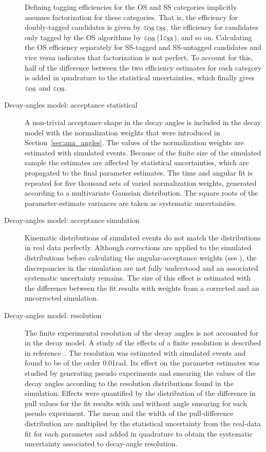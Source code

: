 \begin{description}
Defining tagging efficiencies for the OS and SS categories implicitly assumes factorization for these categories.  That is, the efficiency
for doubly-tagged candidates is given by $\tagCatCoef[\text{OS}]\,\tagCatCoef[\text{SS}]$, the efficiency for candidates only tagged by the
OS algorithms by $\tagCatCoef[\text{OS}]$\,(1\textminus$\tagCatCoef[\text{SS}]$), and so on. Calculating the OS efficiency separately for
SS-tagged and SS-untagged candidates and vice versa indicates that factorization is not perfect. To account for this, half of the
difference between the two efficiency estimates for each category is added in quadrature to the statistical uncertainties, which finally
gives $\tagCatCoef[\text{OS}]$ and $\tagCatCoef[\text{OS}]$.

\item[Decay-angles model: acceptance statistical]
A non-trivial acceptance shape in the decay angles is included in the decay model with the normalization weights that were introduced in
Section~\ref{sec:ana_angles}. The values of the normalization weights are estimated with simulated events. Because of the finite size of
the simulated sample the estimates are affected by statistical uncertainties, which are propagated to the final parameter estimates. The
time and angular fit is repeated for five thousand sets of varied normalization weights, generated according to a multivariate Gaussian
distribution. The square roots of the parameter-estimate variances are taken as systematic uncertainties.

\item[Decay-angles model: acceptance simulation]
Kinematic distributions of simulated events do not match the distributions in real data perfectly. Although corrections are applied to the
simulated distributions before calculating the angular-acceptance weights (see \cite{LHCb-ANA-2014-039}), the discrepancies in the
simulation are not fully understood and an associated systematic uncertainty remains. The size of this effect is estimated with the
difference between the fit results with weights from a corrected and an uncorrected simulation.

\item[Decay-angles model: resolution]
The finite experimental resolution of the decay angles is not accounted for in the decay model. A study of the effects of a finite
resolution is described in reference~\cite{LHCb-ANA-2014-039}. The resolution was estimated with simulated events and found to be of the
order 0.01\unitsp{}rad. Its effect on the parameter estimates was studied by generating pseudo experiments and smearing the values of the
decay angles according to the resolution distributions found in the simulation. Effects were quantified by the distribution of the
difference in pull values for the fit results with and without angle smearing for each pseudo experiment. The mean and the width of the
pull-difference distribution are multiplied by the statistical uncertainty from the real-data fit for each parameter and added in
quadrature to obtain the systematic uncertainty associated to decay-angle resolution.


\end{description}
